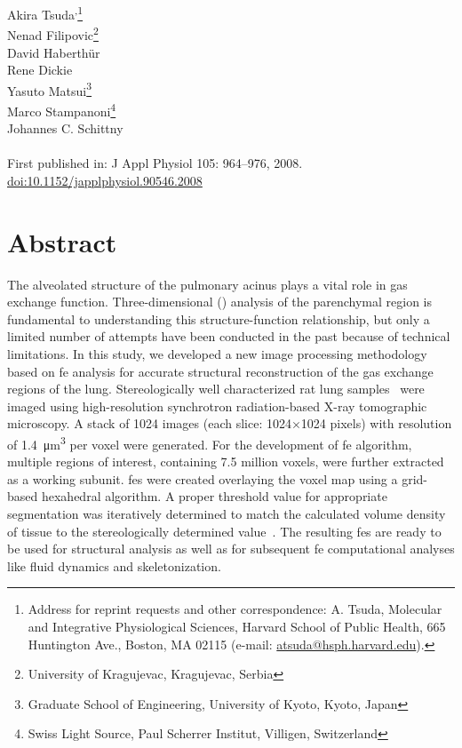 \label{ch:tsuda2008}

Akira Tsuda\textsuperscript{,}\footnote{Address for reprint requests and other correspondence: A. Tsuda, Molecular and Integrative Physiological Sciences, Harvard School of Public Health, 665 Huntington Ave., Boston, MA 02115 (e-mail: \href{mailto:atsuda@hsph.harvard.edu}{atsuda@hsph.harvard.edu}).}\\%
Nenad Filipovic\footnote{University of Kragujevac, Kragujevac, Serbia}\\%
David Haberthür\\%
Rene Dickie\\%
Yasuto Matsui\footnote{Graduate School of Engineering, University of Kyoto, Kyoto, Japan}\\%
Marco Stampanoni\footnote{Swiss Light Source, Paul Scherrer Institut, Villigen, Switzerland}\\%
Johannes C. Schittny\\\\
First published in: J Appl Physiol 105: 964–976, 2008.\\
\href{http://dx.doi.org/doi:10.1152/japplphysiol.90546.2008}{doi:10.1152/japplphysiol.90546.2008}
 
\section{Abstract}
The alveolated structure of the pulmonary acinus plays a vital role in gas exchange function. Three-dimensional (\threed) analysis of the parenchymal region is fundamental to understanding this structure-function relationship, but only a limited number of attempts have been conducted in the past because of technical limitations. In this study, we developed a new image processing methodology based on \ac{fe} analysis for accurate \threed structural reconstruction of the gas exchange regions of the lung. Stereologically well characterized rat lung samples~\cite{Tschanz2003} were imaged using high-resolution synchrotron radiation-based X-ray tomographic microscopy. A stack of 1024 images (each slice: 1024$\times$1024 pixels) with resolution of \SI{1.4}{\micro\meter\cubed} per voxel were generated. For the development of \ac{fe} algorithm, multiple regions of interest, containing 7.5 million voxels, were further extracted as a working subunit. \threed \acp{fe} were created overlaying the voxel map using a grid-based hexahedral algorithm. A proper threshold value for appropriate segmentation was iteratively determined to match the calculated volume density of tissue to the stereologically determined value~\cite{Tschanz2003}. The resulting \threed \acp{fe} are ready to be used for \threed structural analysis as well as for subsequent \ac{fe} computational analyses like fluid dynamics and skeletonization.


